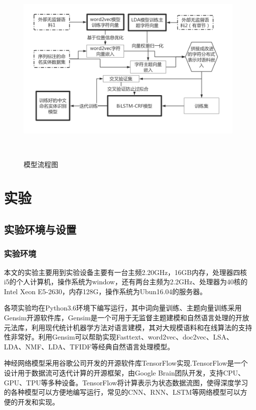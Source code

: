 \documentclass[winfonts,master,oneside,nobackinfo]{njuthesis}
\begin{document}
\begin{figure}[H]
\centering
\begin{minipage}[t]{\textwidth}
\includegraphics[width=1\textwidth,height=9.5cm]{./figure/改进的字符分布式表示.jpg}
\caption{模型流程图}
\label{lab:1}
\end{minipage}
\end{figure}

\section{实验}

\subsection{实验环境与设置}

\subsubsection{实验环境}

本文的实验主要用到实验设备主要有一台主频2.20GHz，16GB内存，处理器四核i5的个人计算机，操作系统为window，还有两台主频为2.2GHz、处理器为40核的Intel Xeon E5-2630，内存128G，操作系统为Ubun16.04的服务器。

各项实验均在Python3.6环境下编写运行，其中词向量训练、主题向量训练采用Gensim开源软件库，Gensim是一个可用于无监督主题建模和自然语言处理的开放元法库，利用现代统计机器学方法对语言建模，其对大规模语料和在线算法的支持性非常好。利用Gensim可以帮助实现Fasttext、word2vec、doc2vec、LSA、LDA、NMF、LDA、TFIDF等经典自然语言处理模型。

神经网络模型采用谷歌公司开发的开源软件库TensorFlow\cite{TensorFlow}实现.TensorFlow是一个设计用于数据流可迭代计算的开源框架，由Google Brain团队开发，支持CPU、GPU、TPU等多种设备。TensorFlow将计算表示为状态数据流图，使得深度学习的各种模型可以方便地编写运行，常见的CNN、RNN、LSTM等网络模型可以方便的开发和实现。
\end{document}
